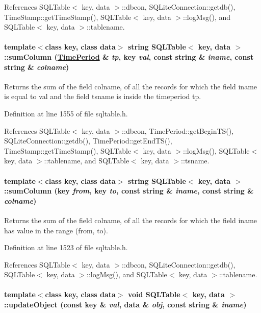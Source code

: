 References SQLTable$<$ key, data $>$::dbcon, SQLite\-Connection::getdb(), Time\-Stamp::get\-Time\-Stamp(), SQLTable$<$ key, data $>$::log\-Msg(), and SQLTable$<$ key, data $>$::tablename.\hypertarget{classSQLTable_SQLTablea33}{
\paragraph[sumColumn]{\setlength{\rightskip}{0pt plus 5cm}template$<$class key, class data$>$ string SQLTable$<$ key, data $>$::sum\-Column (\hyperlink{classTimePeriod}{Time\-Period} \& {\em tp}, key {\em val}, const string \& {\em iname}, const string \& {\em colname})}\hfill}
\label{classSQLTable_SQLTablea33}


Returns the sum of the field colname, of all the records for which the field iname is equal to val and the field tsname is inside the timeperiod tp. 

Definition at line 1555 of file sqltable.h.

References SQLTable$<$ key, data $>$::dbcon, Time\-Period::get\-Begin\-TS(), SQLite\-Connection::getdb(), Time\-Period::get\-End\-TS(), Time\-Stamp::get\-Time\-Stamp(), SQLTable$<$ key, data $>$::log\-Msg(), SQLTable$<$ key, data $>$::tablename, and SQLTable$<$ key, data $>$::tsname.\hypertarget{classSQLTable_SQLTablea32}{
\paragraph[sumColumn]{\setlength{\rightskip}{0pt plus 5cm}template$<$class key, class data$>$ string SQLTable$<$ key, data $>$::sum\-Column (key {\em from}, key {\em to}, const string \& {\em iname}, const string \& {\em colname})}\hfill}
\label{classSQLTable_SQLTablea32}


Returns the sum of the field colname, of all the records for which the field iname has value in the range (from, to). 

Definition at line 1523 of file sqltable.h.

References SQLTable$<$ key, data $>$::dbcon, SQLite\-Connection::getdb(), SQLTable$<$ key, data $>$::log\-Msg(), and SQLTable$<$ key, data $>$::tablename.\hypertarget{classSQLTable_SQLTablea20}{
\paragraph[updateObject]{\setlength{\rightskip}{0pt plus 5cm}template$<$class key, class data$>$ void SQLTable$<$ key, data $>$::update\-Object (const key \& {\em val}, data \& {\em obj}, const string \& {\em iname})}\hfill}
\label{classSQLTable_SQLTablea20}


